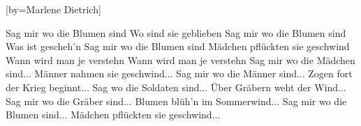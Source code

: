 [by={Marlene Dietrich}] 	

\beginverse
Sag mir wo die Blumen sind
Wo sind sie geblieben
Sag mir wo die Blumen sind
Was ist gescheh'n
Sag mir wo die Blumen sind
Mädchen pflückten sie geschwind
Wann wird man je verstehn
Wann wird man je verstehn
\endverse
\beginverse
Sag mir wo die Mädchen sind...
Männer nahmen sie geschwind...
\endverse
\beginverse
Sag mir wo die Männer sind...
Zogen fort der Krieg beginnt...
\endverse
\beginverse
Sag wo die Soldaten sind...
Über Gräbern weht der Wind...
\endverse
\beginverse
Sag mir wo die Gräber sind...
Blumen blüh'n im Sommerwind...
\endverse
\beginverse
Sag mir wo die Blumen sind...
Mädchen pflückten sie geschwind...
\endverse
\endsong

